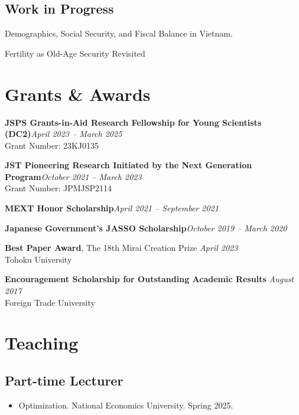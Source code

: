 \documentclass[12pt]{article}
\begin{document}
\subsection{Work in Progress}

\begin{enumerate}[label={[\arabic*]}]

\item Demographics, Social Security, and Fiscal Balance in Vietnam.

\item Fertility as Old-Age Security Revisited
\end{enumerate}


\section{Grants \& Awards}

\textbf{JSPS Grants-in-Aid Research Fellowship for Young Scientists (DC2)}\hfill \emph{April 2023 -- March 2025}\\
Grant Number: 23KJ0135

\textbf{JST Pioneering Research Initiated by the Next Generation Program}\hfill \emph{October 2021 -- March 2023}\\
Grant Number: JPMJSP2114

\textbf{MEXT Honor Scholarship}\hfill \emph{April 2021 -- September 2021}

\textbf{Japanese Government's JASSO Scholarship}\hfill \emph{October 2019 -- March 2020}

\textbf{Best Paper Award}, The 18th Mirai Creation Prize \hfill \emph{April 2023}\\
Tohoku University

\textbf{Encouragement Scholarship for Outstanding Academic Results} \hfill \emph{August 2017}\\
Foreign Trade University


\section{Teaching}

\subsection{Part-time Lecturer}
\begin{itemize}
	\item[ ] Optimization. National Economics University. Spring 2025.
\end{itemize}
\end{document}
